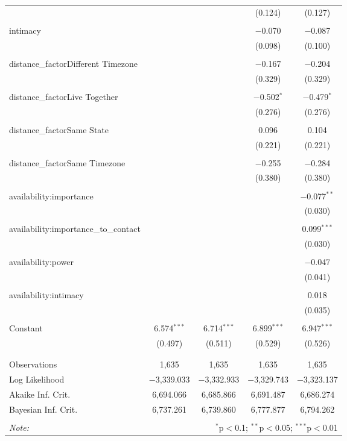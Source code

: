 \documentclass[12pt]{nuthesis}	%
\begin{document}
\begin{table}[!htbp]
\begin{tabular}{@{\extracolsep{5pt}}lcccc}
  &  &  & (0.124) & (0.127) \\ 
  & & & & \\ 
 intimacy &  &  & $-$0.070 & $-$0.087 \\ 
  &  &  & (0.098) & (0.100) \\ 
  & & & & \\ 
 distance\_factorDifferent Timezone &  &  & $-$0.167 & $-$0.204 \\ 
  &  &  & (0.329) & (0.329) \\ 
  & & & & \\ 
 distance\_factorLive Together &  &  & $-$0.502$^{*}$ & $-$0.479$^{*}$ \\ 
  &  &  & (0.276) & (0.276) \\ 
  & & & & \\ 
 distance\_factorSame State &  &  & 0.096 & 0.104 \\ 
  &  &  & (0.221) & (0.221) \\ 
  & & & & \\ 
 distance\_factorSame Timezone &  &  & $-$0.255 & $-$0.284 \\ 
  &  &  & (0.380) & (0.380) \\ 
  & & & & \\ 
 availability:importance &  &  &  & $-$0.077$^{**}$ \\ 
  &  &  &  & (0.030) \\ 
  & & & & \\ 
 availability:importance\_to\_contact &  &  &  & 0.099$^{***}$ \\ 
  &  &  &  & (0.030) \\ 
  & & & & \\ 
 availability:power &  &  &  & $-$0.047 \\ 
  &  &  &  & (0.041) \\ 
  & & & & \\ 
 availability:intimacy &  &  &  & 0.018 \\ 
  &  &  &  & (0.035) \\ 
  & & & & \\ 
 Constant & 6.574$^{***}$ & 6.714$^{***}$ & 6.899$^{***}$ & 6.947$^{***}$ \\ 
  & (0.497) & (0.511) & (0.529) & (0.526) \\ 
  & & & & \\ 
\hline \\[-1.8ex] 
Observations & 1,635 & 1,635 & 1,635 & 1,635 \\ 
Log Likelihood & $-$3,339.033 & $-$3,332.933 & $-$3,329.743 & $-$3,323.137 \\ 
Akaike Inf. Crit. & 6,694.066 & 6,685.866 & 6,691.487 & 6,686.274 \\ 
Bayesian Inf. Crit. & 6,737.261 & 6,739.860 & 6,777.877 & 6,794.262 \\ 
\hline 
\hline \\[-1.8ex] 
\textit{Note:}  & \multicolumn{4}{r}{$^{*}$p$<$0.1; $^{**}$p$<$0.05; $^{***}$p$<$0.01} \\ 
\end{tabular} 
\end{table} 
\end{document}
